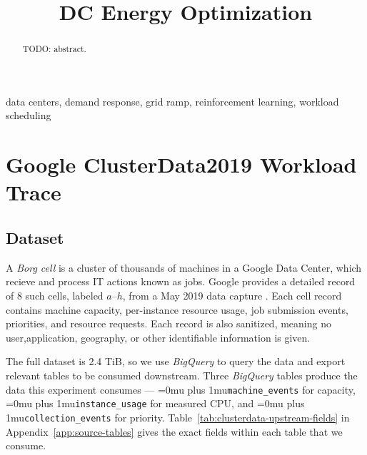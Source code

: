 \documentclass[conference]{IEEEtran}
\newcommand{\codepath}[1]{{\Urlmuskip=0mu plus 1mu\relax\nolinkurl{#1}}}
\begin{document}
\title{DC Energy Optimization}

\author{
}

\maketitle

\begin{abstract}
TODO: abstract.
\end{abstract}

\begin{IEEEkeywords}
data centers, demand response, grid ramp, reinforcement learning, workload
scheduling
\end{IEEEkeywords}

\section{Google ClusterData2019 Workload Trace}
\label{sec:clusterdata2019}

\subsection{Dataset}
\label{subsec:clusterdata-role}

A \emph{Borg cell} is a cluster of thousands of machines in a Google Data Center, which recieve and process IT actions known as jobs. Google provides a detailed record of 8 such cells, labeled \(a\)--\(h\), from a May 2019 data capture \cite{wilkes2020clusterdata2019}. Each cell record contains machine capacity, per-instance resource usage, job submission events, priorities, and resource requests. Each record is also sanitized, meaning no user,application, geography, or other identifiable information is given. 

The full dataset is 2.4 TiB, so we use \emph{BigQuery} to query the data and export relevant tables to be consumed downstream. Three \emph{BigQuery} tables produce the data this experiment consumes --- \codepath{machine_events} for capacity, \codepath{instance_usage} for measured CPU, and \codepath{collection_events} for priority. Table~\ref{tab:clusterdata-upstream-fields} in Appendix~\ref{app:source-tables} gives the exact fields within each table that we consume.
\end{document}
